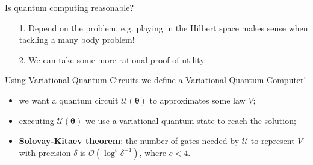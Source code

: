 \documentclass[aspectratio=169, 8pt, xcolor={svgnames}, hyperref={linkcolor=black}]{beamer}
\begin{document}
\begin{frame}{Is quantum computing reasonable?}
\pause
\begin{itemize}[noitemsep]
\item[1.] Depend on the problem\pause, e.g. playing in the Hilbert space
makes sense when tackling a many body problem!
\pause
\item[2.] We can take some more rational proof of utility.
\end{itemize}
\pause
Using Variational Quantum Circuits we define a Variational Quantum Computer!
\pause
\begin{multicols}{2}
\begin{itemize}[noitemsep]
\item<7,8,9>[1.] we want a quantum circuit $\mathcal{U}(\bm{\theta})$ to approximates some law $V$;
\item<8,9>[2.] executing $\mathcal{U}(\bm{\theta})$ we use a variational quantum state
to reach the solution;
\item<9>[3.] \textbf{Solovay-Kitaev theorem}: the number of gates needed by $\mathcal{U}$ to
represent $V$ with precision $\delta$ is $\mathcal{O}(\log^c \delta^{-1})$, where
$c<4$.
\end{itemize}
\begin{figure}
\end{figure}
\end{multicols}
\end{frame}
\end{document}
